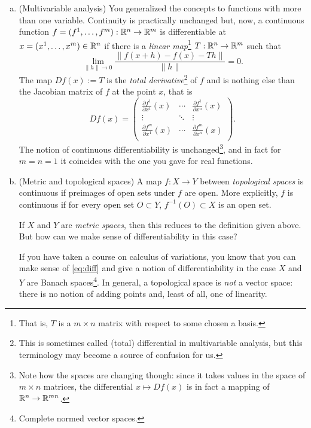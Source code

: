 \begin{enumerate}[a)]
  \item (Multivariable analysis) You generalized the concepts to functions with more than one variable.
  Continuity is practically unchanged but, now, a continuous function $f=(f^1, \ldots, f^m):\mathbb{R}^n\to\mathbb{R}^m$ is differentiable at $x=(x^1,\ldots,x^m)\in\mathbb{R}^n$ if there is a \emph{linear map}\footnote{That is, $T$ is a $m\times n$ matrix with respect to some chosen a basis.} $T: \mathbb{R}^n\to\mathbb{R}^m$ such that
  \begin{equation}\label{eq:diff}
    \lim_{\|h\|\to 0} \frac{\|f(x+h) - f(x) - T h\|}{\|h\|} = 0.
  \end{equation}
  The map $Df(x) := T$ is the \emph{total derivative}\footnote{This is sometimes called (total) differential in multivariable analysis, but this terminology may become a source of confusion for us.} of $f$ and is nothing else than the Jacobian matrix of $f$ at the point $x$, that is
  \begin{equation}\label{eq:jacobian}
    Df(x) = \begin{pmatrix}
      \frac{\partial f^1}{\partial x^1}(x) & \cdots & \frac{\partial f^1}{\partial x^n}(x) \\
      \vdots & \ddots & \vdots \\
      \frac{\partial f^m}{\partial x^1}(x) & \cdots & \frac{\partial f^m}{\partial x^n}(x) \\
    \end{pmatrix}.
  \end{equation} 
  The notion of continuous differentiability is unchanged\footnote{Note how the spaces are changing though: since it takes values in the space of $m\times n$ matrices, the differential $x\mapsto Df(x)$ is in fact a mapping of $\mathbb{R}^n \to \mathbb{R}^{mn}$.}, and in fact for $m=n=1$ it coincides with the one you gave for real functions.
  
  \item (Metric and topological spaces) A map $f:X\to Y$ between \emph{topological spaces} is continuous if preimages of open sets under $f$ are open. More explicitly, $f$ is continuous if for every open set $O\subset Y$, $f^{-1}(O)\subset X$ is an open set.

  If $X$ and $Y$ are \emph{metric spaces}, then this reduces to the definition given above.
  But how can we make sense of differentiability in this case? 
  
  If you have taken a course on calculus of variations, you know that you can make sense of \eqref{eq:diff} and give a notion of differentiability in the case $X$ and $Y$ are Banach spaces\footnote{Complete normed vector spaces.}.
  In general, a topological space is \emph{not} a vector space: there is no notion of adding points and, least of all, one of linearity.
\end{enumerate}

